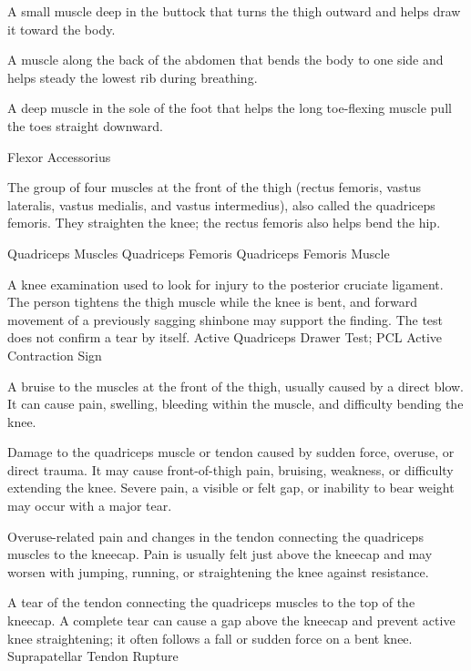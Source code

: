  A small muscle deep in the buttock that turns the thigh outward and helps draw it toward the body.

 A muscle along the back of the abdomen that bends the body to one side and helps steady the lowest rib during breathing.

 A deep muscle in the sole of the foot that helps the long toe-flexing muscle pull the toes straight downward.

\synonyms
Flexor Accessorius

 The group of four muscles at the front of the thigh (rectus femoris, vastus lateralis, vastus medialis, and vastus intermedius), also called the quadriceps femoris. They straighten the knee; the rectus femoris also helps bend the hip.

\synonyms
Quadriceps Muscles
Quadriceps Femoris
Quadriceps Femoris Muscle

 A knee examination used to look for injury to the posterior cruciate ligament. The person tightens the thigh muscle while the knee is bent, and forward movement of a previously sagging shinbone may support the finding. The test does not confirm a tear by itself.
\synonyms
Active Quadriceps Drawer Test; PCL Active Contraction Sign

 A bruise to the muscles at the front of the thigh, usually caused by a direct blow. It can cause pain, swelling, bleeding within the muscle, and difficulty bending the knee.

 Damage to the quadriceps muscle or tendon caused by sudden force, overuse, or direct trauma. It may cause front-of-thigh pain, bruising, weakness, or difficulty extending the knee. Severe pain, a visible or felt gap, or inability to bear weight may occur with a major tear.

 Overuse-related pain and changes in the tendon connecting the quadriceps muscles to the kneecap. Pain is usually felt just above the kneecap and may worsen with jumping, running, or straightening the knee against resistance.

 A tear of the tendon connecting the quadriceps muscles to the top of the kneecap. A complete tear can cause a gap above the kneecap and prevent active knee straightening; it often follows a fall or sudden force on a bent knee.
\synonyms
Suprapatellar Tendon Rupture

